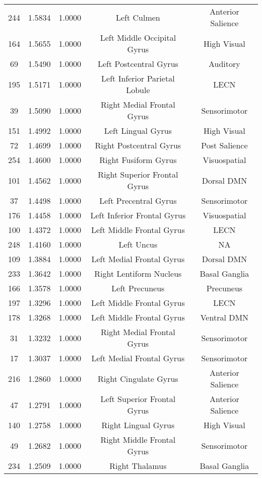 \documentclass[10pt,letterpaper]{article}\usepackage[]{graphicx}\usepackage[]{color}
\begin{document}
\begin{center}
\begin{longtable}[c]{ccccc}
	244	& 1.5834 & 1.0000 & Left Culmen & Anterior Salience \\
	164	& 1.5655 & 1.0000 & Left Middle Occipital Gyrus & High Visual \\
	69	& 1.5490 & 1.0000 & Left Postcentral Gyrus & Auditory \\
	195	& 1.5171 & 1.0000 & Left Inferior Parietal Lobule & LECN \\
	39	& 1.5090 & 1.0000 & Right Medial Frontal Gyrus & Sensorimotor \\
	151	& 1.4992 & 1.0000 & Left Lingual Gyrus & High Visual \\
	72	& 1.4699 & 1.0000 & Right Postcentral Gyrus & Post Salience \\
	254	& 1.4600 & 1.0000 & Right Fusiform Gyrus & Visuospatial \\
	101	& 1.4562 & 1.0000 & Right Superior Frontal Gyrus & Dorsal DMN \\
	37	& 1.4498 & 1.0000 & Left Precentral Gyrus & Sensorimotor \\
	176	& 1.4458 & 1.0000 & Left Inferior Frontal Gyrus & Visuospatial \\
	100	& 1.4372 & 1.0000 & Left Middle Frontal Gyrus & LECN \\
	248	& 1.4160 & 1.0000 & Left Uncus & NA \\
	109	& 1.3884 & 1.0000 & Left Medial Frontal Gyrus & Dorsal DMN \\
	233	& 1.3642 & 1.0000 & Right Lentiform Nucleus & Basal Ganglia \\
	166	& 1.3578 & 1.0000 & Left Precuneus & Precuneus \\
	197	& 1.3296 & 1.0000 & Left Middle Frontal Gyrus & LECN \\
	178	& 1.3268 & 1.0000 & Left Middle Frontal Gyrus & Ventral DMN \\
	31	& 1.3232 & 1.0000 & Right Medial Frontal Gyrus & Sensorimotor \\
	17	& 1.3037 & 1.0000 & Left Medial Frontal Gyrus & Sensorimotor \\
	216	& 1.2860 & 1.0000 & Right Cingulate Gyrus & Anterior Salience \\
	47	& 1.2791 & 1.0000 & Left Superior Frontal Gyrus & Anterior Salience \\
	140	& 1.2758 & 1.0000 & Right Lingual Gyrus & High Visual \\
	49	& 1.2682 & 1.0000 & Right Middle Frontal Gyrus & Sensorimotor \\
	234	& 1.2509 & 1.0000 & Right Thalamus & Basal Ganglia \\

\end{longtable}
\end{center}
\end{document}
